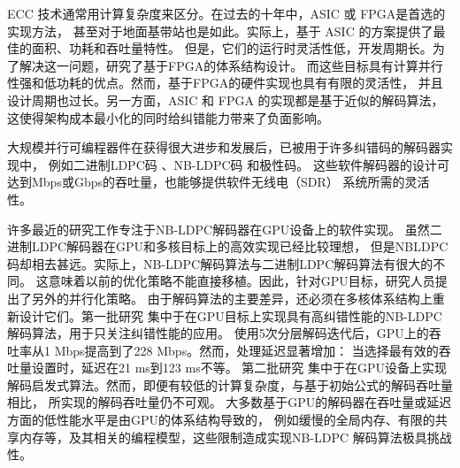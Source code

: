 \documentclass{cjc}
\begin{document}
  ECC 技术通常用计算复杂度来区分。在过去的十年中，ASIC 或 FPGA是首选的实现方法，
  甚至对于地面基带站也是如此。实际上，基于 ASIC 的方案提供了最佳的面积、功耗和吞吐量特性。
  但是，它们的运行时灵活性低，开发周期长。为了解决这一问题，研究了基于FPGA的体系结构设计。
  而这些目标具有计算并行性强和低功耗的优点。然而，基于FPGA的硬件实现也具有有限的灵活性，
  并且设计周期也过长。另一方面，ASIC 和 FPGA 的实现都是基于近似的解码算法，
  这使得架构成本最小化的同时给纠错能力带来了负面影响。

  大规模并行可编程器件在获得很大进步和发展后，已被用于许多纠错码的解码器实现中，
  例如二进制LDPC码\cite{chang_accelerating_2011,falcao_portable_2012,noauthor_wang_nodate-1,li_efficient_2013,lin_high_2014,gal_high-throughput_2016,andrade_survey_2016}
  、NB-LDPC码\cite{noauthor_wang_nodate,noauthor_andrade_nodate,noauthor_beermann_nodate,andrade_optimized_2014,noauthor_thi_nodate,beermann_gpu_2015,noauthor_pham_nodate,liu_high-throughput_2018}
  和极性码\cite{noauthor_gal_nodate,gal_multi-gbs_2015,giard_low-latency_2018}。
  这些软件解码器的设计可达到Mbps或Gbps的吞吐量，也能够提供软件无线电（SDR）\cite{grayver_implementing_2013}
  系统所需的灵活性。

  许多最近的研究工作专注于NB-LDPC解码器在GPU设备上的软件实现\cite{noauthor_wang_nodate,noauthor_andrade_nodate,noauthor_beermann_nodate,andrade_optimized_2014,noauthor_thi_nodate,beermann_gpu_2015,noauthor_pham_nodate,liu_high-throughput_2018}。
  虽然二进制LDPC解码器在GPU和多核目标上的高效实现已经比较理想\cite{chang_accelerating_2011,falcao_portable_2012,noauthor_wang_nodate-1,li_efficient_2013,lin_high_2014,gal_high-throughput_2016,andrade_survey_2016}，
  但是NBLDPC码却相去甚远。实际上，NB-LDPC解码算法与二进制LDPC解码算法有很大的不同。
  这意味着以前的优化策略不能直接移植。因此，针对GPU目标，研究人员提出了另外的并行化策略。
  由于解码算法的主要差异，还必须在多核体系结构上重新设计它们。第一批研究\cite{noauthor_andrade_nodate,noauthor_beermann_nodate,andrade_optimized_2014,beermann_gpu_2015,liu_high-throughput_2018}
  集中于在GPU目标上实现具有高纠错性能的NB-LDPC解码算法，用于只关注纠错性能的应用。
  使用5次分层解码迭代后，GPU上的吞吐率从1 Mbps提高到了228 Mbps。然而，处理延迟显著增加：
  当选择最有效的吞吐量设置时，延迟在21 ms到123 ms不等\cite{liu_high-throughput_2018}。
  第二批研究\cite{noauthor_wang_nodate,noauthor_thi_nodate,noauthor_pham_nodate}
  集中于在GPU设备上实现解码启发式算法。然而，即便有较低的计算复杂度，与基于初始公式的解码吞吐量相比，
  所实现的解码吞吐量仍不可观\cite{noauthor_andrade_nodate,liu_high-throughput_2018}。
  大多数基于GPU的解码器在吞吐量或延迟方面的低性能水平是由GPU的体系结构导致的，
  例如缓慢的全局内存、有限的共享内存等，及其相关的编程模型，这些限制造成实现NB-LDPC
  解码算法极具挑战性。
\end{document}
